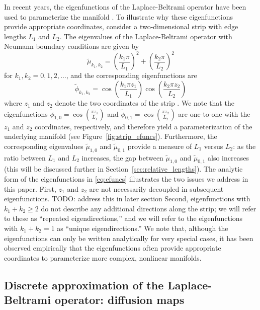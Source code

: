 \documentclass[preprint]{elsarticle}
\begin{document}
In recent years, the eigenfunctions of the Laplace-Beltrami operator have been used to parameterize the manifold \cite{Belkin2003, coifman2005geometric, singer2008non}. 
%
To illustrate why these eigenfunctions provide appropriate coordinates, consider a two-dimensional strip with edge lengths $L_1$ and $L_2$. 
%
The eigenvalues of the Laplace-Beltrami operator with Neumann boundary conditions are given by
\begin{equation} \label{eq:evals}
\tilde{\mu}_{k_1, k_2} = \left( \frac{k_1 \pi}{L_1} \right)^2 + \left( \frac{k_2 \pi}{L_2} \right)^2
\end{equation}
for $k_1, k_2 = 0, 1, 2, \dots$,
and the corresponding eigenfunctions are 
\begin{equation} \label{eq:efuncs}
\tilde{\phi}_{k_1, k_2} = \cos \left( \frac{k_1 \pi z_1}{L_1} \right) \cos \left( \frac{k_2 \pi z_2}{L_2} \right)
\end{equation}
where $z_1$ and $z_2$ denote the two coordinates of the strip \cite{singer2008non}. 
%
We note that the eigenfunctions $\tilde{\phi}_{1, 0} = \cos \left( \frac{\pi z_1}{L_1} \right)$ and $\tilde{\phi}_{0, 1} = \cos \left( \frac{\pi z_2}{L_2} \right)$ are one-to-one with the $z_1$ and $z_2$ coordinates, respectively, and therefore yield a parameterization of the underlying manifold (see Figure~\ref{fig:strip_efuncs}). 
%
Furthermore, the corresponding eigenvalues $\tilde{\mu}_{1,0}$ and $\tilde{\mu}_{0,1}$ provide a measure of $L_1$ versus $L_2$: as the ratio between $L_1$ and $L_2$ increases, the gap between $\tilde{\mu}_{1,0}$ and $\tilde{\mu}_{0,1}$ also increases (this will be discussed further in Section~\ref{sec:relative_lengths}).
%
The analytic form of the eigenfunctions in \eqref{eq:efuncs} illustrates the two issues we address in this paper. 
%
First, $z_1$ and $z_2$ are not necessarily decoupled in subsequent eigenfunctions. 
TODO: address this in later section
%
Second, eigenfunctions with $k_1+k_2 \ge 2$ do not describe any additional directions along the strip; we will refer to these as ``repeated eigendirections,'' and we will refer to the eigenfunctions with $k_1+k_2 =1$ as ``unique eigendirections.''
%
We note that, although the eigenfunctions can only be written analytically for very special cases, it has been observed empirically that the eigenfunctions often provide appropriate coordinates to parameterize more complex, nonlinear manifolds. 


\subsection{Discrete approximation of the Laplace-Beltrami operator: diffusion maps}
\end{document}
